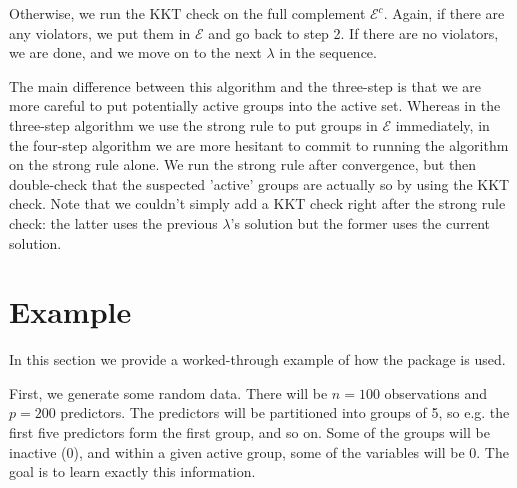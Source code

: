 \documentclass[12pt]{article}
\begin{document}
Otherwise, we run the KKT check on the full complement $\mathcal{E}^c$. Again, if there are any violators, we put them in $\mathcal{E}$ and go back to step 2. If there are no violators, we are done, and we move on to the next $\lambda$ in the sequence.

The main difference between this algorithm and the three-step is that we are more careful to put potentially active groups into the active set. Whereas in the three-step algorithm we use the strong rule to put groups in $\mathcal{E}$ immediately, in the four-step algorithm we are more hesitant to commit to running the algorithm on the strong rule alone. We run the strong rule after convergence, but then double-check that the suspected 'active' groups are actually so by using the KKT check. Note that we couldn't simply add a KKT check right after the strong rule check: the latter uses the previous $\lambda$'s solution but the former uses the current solution.



\section{Example}

In this section we provide a worked-through example of how the package is used. 

First, we generate some random data. There will be $n=100$ observations and $p=200$ predictors. The predictors will be partitioned into groups of 5, so e.g. the first five predictors form the first group, and so on. Some of the groups will be inactive ($0$), and within a given active group, some of the variables will be $0$. The goal is to learn exactly this information.
\end{document}
